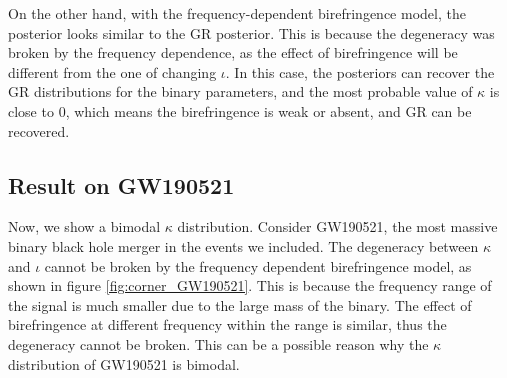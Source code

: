 \documentclass[aps,prd,twocolumn,superscriptaddress,preprintnumbers,floatfix,nofootinbib]{revtex4-2}
\begin{document}
On the other hand, with the frequency-dependent birefringence model, the posterior looks similar to the GR posterior.
This is because the degeneracy was broken by the frequency dependence, as the effect of birefringence will be different from the one of changing $\iota$.
In this case, the posteriors can recover the GR distributions for the binary parameters,
and the most probable value of $\kappa$ is close to $0$, which means the birefringence is weak or absent, and GR can be recovered.


\subsection{Result on GW190521}

Now, we show a bimodal $\kappa$ distribution.
Consider GW190521, the most massive binary black hole merger in the events we included.
The degeneracy between $\kappa$ and $\iota$ cannot be broken by the frequency dependent birefringence model, as shown in figure \ref{fig:corner_GW190521}.
This is because the frequency range of the signal is much smaller due to the large mass of the binary.
The effect of birefringence at different frequency within the range is similar, thus the degeneracy cannot be broken.
This can be a possible reason why the $\kappa$ distribution of GW190521 is bimodal.

\end{document}
